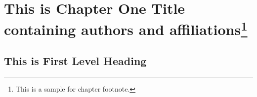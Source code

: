 
\chapter[This is Chapter One Title containing authors and affiliations]{This is Chapter One Title containing authors and affiliations\protect\footnote{This is a sample for chapter footnote.}}

\author*[1]{Author I}
\author[2]{Author II}
\author[1]{Author III}
\author[3]{Author IV}

\address[1]{, 
, 
, , 
     , , }%

\address[2]{, 
, 
, , 
     , , }%

\address[3]{, 
, 
, , 
     , , }%

\address*{Corresponding Author: Author; }

\maketitle%

\begin{abstract}{Abstract Title Here}
Abstract para text. Abstract para text. Abstract para text. Abstract para text. 
Abstract para text. Abstract para text. Abstract para text. Abstract para text.

Abstract next para text. Abstract para text. Abstract para text. Abstract para text. 
Abstract para text. If multiple abstracts exists, then \textbf{absgroup} tag 
will be inserted by the tool.
\end{abstract}

\begin{abstract}{}
Abstract text. Abstract text. Abstract text. Abstract text. 
\end{abstract}


\section{This is First Level Heading}

